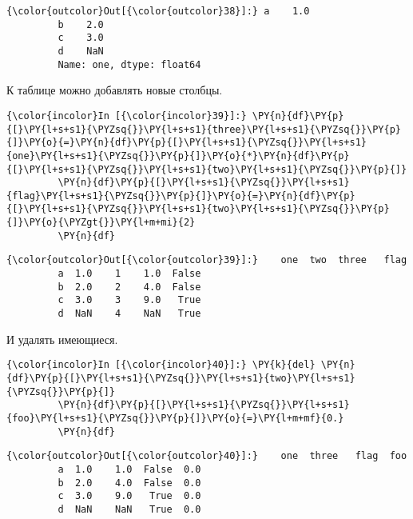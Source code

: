             \begin{Verbatim}[commandchars=\\\{\}]
{\color{outcolor}Out[{\color{outcolor}38}]:} a    1.0
         b    2.0
         c    3.0
         d    NaN
         Name: one, dtype: float64
\end{Verbatim}
        
    К таблице можно добавлять новые столбцы.

    \begin{Verbatim}[commandchars=\\\{\}]
{\color{incolor}In [{\color{incolor}39}]:} \PY{n}{df}\PY{p}{[}\PY{l+s+s1}{\PYZsq{}}\PY{l+s+s1}{three}\PY{l+s+s1}{\PYZsq{}}\PY{p}{]}\PY{o}{=}\PY{n}{df}\PY{p}{[}\PY{l+s+s1}{\PYZsq{}}\PY{l+s+s1}{one}\PY{l+s+s1}{\PYZsq{}}\PY{p}{]}\PY{o}{*}\PY{n}{df}\PY{p}{[}\PY{l+s+s1}{\PYZsq{}}\PY{l+s+s1}{two}\PY{l+s+s1}{\PYZsq{}}\PY{p}{]}
         \PY{n}{df}\PY{p}{[}\PY{l+s+s1}{\PYZsq{}}\PY{l+s+s1}{flag}\PY{l+s+s1}{\PYZsq{}}\PY{p}{]}\PY{o}{=}\PY{n}{df}\PY{p}{[}\PY{l+s+s1}{\PYZsq{}}\PY{l+s+s1}{two}\PY{l+s+s1}{\PYZsq{}}\PY{p}{]}\PY{o}{\PYZgt{}}\PY{l+m+mi}{2}
         \PY{n}{df}
\end{Verbatim}

            \begin{Verbatim}[commandchars=\\\{\}]
{\color{outcolor}Out[{\color{outcolor}39}]:}    one  two  three   flag
         a  1.0    1    1.0  False
         b  2.0    2    4.0  False
         c  3.0    3    9.0   True
         d  NaN    4    NaN   True
\end{Verbatim}
        
    И удалять имеющиеся.

    \begin{Verbatim}[commandchars=\\\{\}]
{\color{incolor}In [{\color{incolor}40}]:} \PY{k}{del} \PY{n}{df}\PY{p}{[}\PY{l+s+s1}{\PYZsq{}}\PY{l+s+s1}{two}\PY{l+s+s1}{\PYZsq{}}\PY{p}{]}
         \PY{n}{df}\PY{p}{[}\PY{l+s+s1}{\PYZsq{}}\PY{l+s+s1}{foo}\PY{l+s+s1}{\PYZsq{}}\PY{p}{]}\PY{o}{=}\PY{l+m+mf}{0.}
         \PY{n}{df}
\end{Verbatim}

            \begin{Verbatim}[commandchars=\\\{\}]
{\color{outcolor}Out[{\color{outcolor}40}]:}    one  three   flag  foo
         a  1.0    1.0  False  0.0
         b  2.0    4.0  False  0.0
         c  3.0    9.0   True  0.0
         d  NaN    NaN   True  0.0
\end{Verbatim}
        
